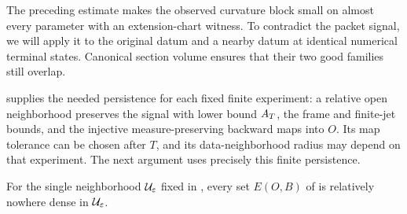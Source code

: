 The preceding estimate makes the observed curvature block small on
almost every parameter with an extension-chart witness. To contradict
the packet signal, we will apply it to the original datum and a nearby
datum at identical numerical terminal states. Canonical section volume
ensures that their two good families still overlap.

 supplies the needed persistence for each
fixed finite experiment: a relative open neighborhood preserves the
signal with lower bound $A_T$, the frame and finite-jet bounds, and
the injective measure-preserving backward maps into $O$. Its map
tolerance can be chosen after $T$, and its data-neighborhood radius
may depend on that experiment. The next argument uses precisely this
finite persistence.

\begin{theorem}
\label{thm:nowhere-dense}
For the single neighborhood $\mathcal U_{\varepsilon}$ fixed in
, every set $E(O,B)$ of  is
relatively nowhere dense in $\mathcal U_{\varepsilon}$.
\end{theorem}

